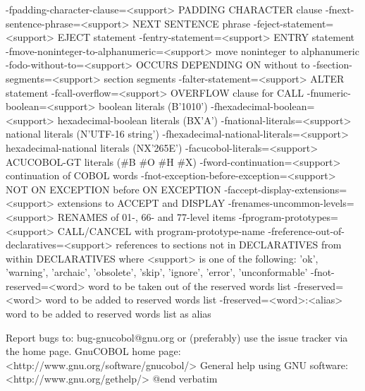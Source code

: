   -fpadding-character-clause=<support>	PADDING CHARACTER clause
  -fnext-sentence-phrase=<support>	NEXT SENTENCE phrase
  -feject-statement=<support>	EJECT statement
  -fentry-statement=<support>	ENTRY statement
  -fmove-noninteger-to-alphanumeric=<support>	move noninteger to alphanumeric
  -fodo-without-to=<support>	OCCURS DEPENDING ON without to
  -fsection-segments=<support>	section segments
  -falter-statement=<support>	ALTER statement
  -fcall-overflow=<support>	OVERFLOW clause for CALL
  -fnumeric-boolean=<support>	boolean literals (B'1010')
  -fhexadecimal-boolean=<support>	hexadecimal-boolean literals (BX'A')
  -fnational-literals=<support>	national literals (N'UTF-16 string')
  -fhexadecimal-national-literals=<support>	hexadecimal-national literals (NX'265E')
  -facucobol-literals=<support>	ACUCOBOL-GT literals (#B #O #H #X)
  -fword-continuation=<support>	continuation of COBOL words
  -fnot-exception-before-exception=<support>	NOT ON EXCEPTION before ON EXCEPTION
  -faccept-display-extensions=<support>	extensions to ACCEPT and DISPLAY
  -frenames-uncommon-levels=<support>	RENAMES of 01-, 66- and 77-level items
  -fprogram-prototypes=<support>	CALL/CANCEL with program-prototype-name
  -freference-out-of-declaratives=<support>	references to sections not in DECLARATIVES from within DECLARATIVES
	where <support> is one of the following:
	'ok', 'warning', 'archaic', 'obsolete', 'skip', 'ignore', 'error', 'unconformable'
  -fnot-reserved=<word>	word to be taken out of the reserved words list
  -freserved=<word>    	word to be added to reserved words list
  -freserved=<word>:<alias>	word to be added to reserved words list as alias


Report bugs to: bug-gnucobol@gnu.org
or (preferably) use the issue tracker via the home page.
GnuCOBOL home page: <http://www.gnu.org/software/gnucobol/>
General help using GNU software: <http://www.gnu.org/gethelp/>
@end verbatim

